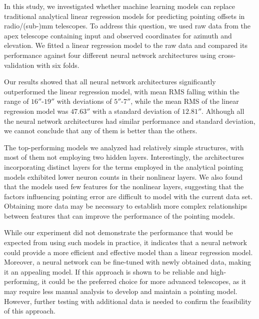 In this study, we investigated whether machine learning models can replace traditional analytical linear regression models for predicting pointing offsets in radio/(sub-)mm telescopes.
To address this question, we used raw data from the apex telescope containing input and observed coordinates for azimuth and elevation.
We fitted a linear regression model to the raw data and compared its performance against four different neural network architectures using cross-validation with six folds.

Our results showed that all neural network architectures significantly outperformed the linear regression model, with mean RMS falling within the range of $16''$-$19''$ with deviations of $5''$-$7''$, while the mean RMS of the linear regression model was $47.63''$ with a standard deviation of $12.81''$.
Although all the neural network architectures had similar performance and standard deviation, we cannot conclude that any of them is better than the others.

The top-performing models we analyzed had relatively simple structures, with most of them not employing two hidden layers.
Interestingly, the architectures incorporating distinct layers for the terms employed in the analytical pointing models exhibited lower neuron counts in their nonlinear layers.
We also found that the models used few features for the nonlinear layers, suggesting that the factors influencing pointing error are difficult to model with the current data set.
Obtaining more data may be necessary to establish more complex relationships between features that can improve the performance of the pointing models.

While our experiment did not demonstrate the performance that would be expected from using such models in practice, it indicates that a neural network could provide a more efficient and effective model than a linear regression model.
Moreover, a neural network can be fine-tuned with newly obtained data, making it an appealing model.
If this approach is shown to be reliable and high-performing, it could be the preferred choice for more advanced telescopes, as it may require less manual analysis to develop and maintain a pointing model.
However, further testing with additional data is needed to confirm the feasibility of this approach.


